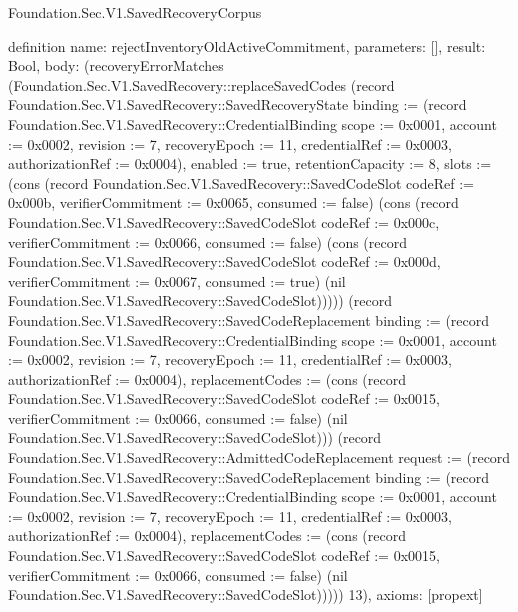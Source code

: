 \begin{lexlean}{Foundation.Sec.V1.SavedRecoveryCorpus}
\begin{semanticmodule}
definition{
  name: rejectInventoryOldActiveCommitment,
  parameters: [],
  result: Bool,
  body: (recoveryErrorMatches (Foundation.Sec.V1.SavedRecovery::replaceSavedCodes (record Foundation.Sec.V1.SavedRecovery::SavedRecoveryState {binding := (record Foundation.Sec.V1.SavedRecovery::CredentialBinding {scope := 0x0001, account := 0x0002, revision := 7, recoveryEpoch := 11, credentialRef := 0x0003, authorizationRef := 0x0004}), enabled := true, retentionCapacity := 8, slots := (cons (record Foundation.Sec.V1.SavedRecovery::SavedCodeSlot {codeRef := 0x000b, verifierCommitment := 0x0065, consumed := false}) (cons (record Foundation.Sec.V1.SavedRecovery::SavedCodeSlot {codeRef := 0x000c, verifierCommitment := 0x0066, consumed := false}) (cons (record Foundation.Sec.V1.SavedRecovery::SavedCodeSlot {codeRef := 0x000d, verifierCommitment := 0x0067, consumed := true}) (nil Foundation.Sec.V1.SavedRecovery::SavedCodeSlot))))}) (record Foundation.Sec.V1.SavedRecovery::SavedCodeReplacement {binding := (record Foundation.Sec.V1.SavedRecovery::CredentialBinding {scope := 0x0001, account := 0x0002, revision := 7, recoveryEpoch := 11, credentialRef := 0x0003, authorizationRef := 0x0004}), replacementCodes := (cons (record Foundation.Sec.V1.SavedRecovery::SavedCodeSlot {codeRef := 0x0015, verifierCommitment := 0x0066, consumed := false}) (nil Foundation.Sec.V1.SavedRecovery::SavedCodeSlot))}) (record Foundation.Sec.V1.SavedRecovery::AdmittedCodeReplacement {request := (record Foundation.Sec.V1.SavedRecovery::SavedCodeReplacement {binding := (record Foundation.Sec.V1.SavedRecovery::CredentialBinding {scope := 0x0001, account := 0x0002, revision := 7, recoveryEpoch := 11, credentialRef := 0x0003, authorizationRef := 0x0004}), replacementCodes := (cons (record Foundation.Sec.V1.SavedRecovery::SavedCodeSlot {codeRef := 0x0015, verifierCommitment := 0x0066, consumed := false}) (nil Foundation.Sec.V1.SavedRecovery::SavedCodeSlot))})})) 13),
  axioms: [propext]
}


\end{semanticmodule}
\end{lexlean}
